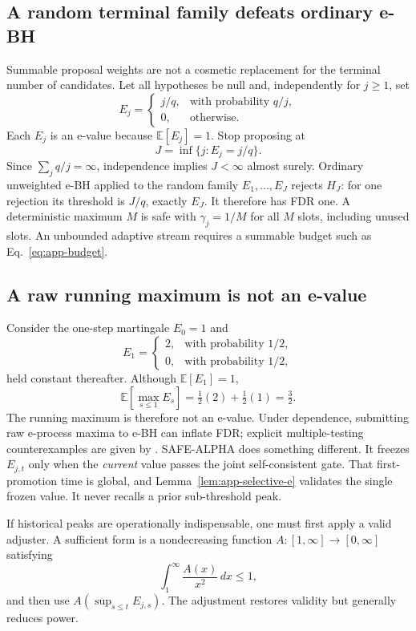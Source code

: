 \subsection{A random terminal family defeats ordinary e-BH}
\label{app:random-family}

Summable proposal weights are not a cosmetic replacement for the terminal
number of candidates.  Let all hypotheses be null and, independently for
\(j\geq1\), set
\[
 E_j=
 \begin{cases}
   j/q,&\text{with probability }q/j,\\
   0,&\text{otherwise}.
 \end{cases}
\]
Each \(E_j\) is an e-value because \(\mathbb E[E_j]=1\).  Stop proposing at
\[
  J=\inf\{j:E_j=j/q\}.
\]
Since \(\sum_jq/j=\infty\), independence implies \(J<\infty\) almost surely.
Ordinary unweighted e-BH applied to the random family
\(E_1,\ldots,E_J\) rejects \(H_J\): for one rejection its threshold is
\(J/q\), exactly \(E_J\).  It therefore has FDR one.  A deterministic
maximum \(M\) is safe with \(\gamma_j=1/M\) for all \(M\) slots, including
unused slots.  An unbounded adaptive stream requires a summable budget such
as Eq.~\eqref{eq:app-budget}.

\subsection{A raw running maximum is not an e-value}
\label{app:running-max}

Consider the one-step martingale \(E_0=1\) and
\[
  E_1=
  \begin{cases}
    2,&\text{with probability }1/2,\\
    0,&\text{with probability }1/2,
  \end{cases}
\]
held constant thereafter.  Although \(\mathbb E[E_1]=1\),
\[
  \mathbb E\!\left[\max_{s\leq1}E_s\right]
  =\tfrac12(2)+\tfrac12(1)=\tfrac32.
\]
The running maximum is therefore not an e-value.  Under dependence,
submitting raw e-process maxima to e-BH can inflate FDR; explicit
multiple-testing counterexamples are given by
\citet{tavyrikov2025carefree}.  SAFE-ALPHA does something different.  It
freezes \(E_{j,t}\) only when the \emph{current} value passes the joint
self-consistent gate.  That first-promotion time is global, and
Lemma~\ref{lem:app-selective-e} validates the single frozen value.  It never
recalls a prior sub-threshold peak.

If historical peaks are operationally indispensable, one must first apply a
valid adjuster.  A sufficient form is a nondecreasing function
\(A:[1,\infty]\to[0,\infty]\) satisfying
\[
  \int_1^\infty\frac{A(x)}{x^2}\,dx\leq1,
\]
and then use \(A(\sup_{s\leq t}E_{j,s})\).  The adjustment restores validity
but generally reduces power.

